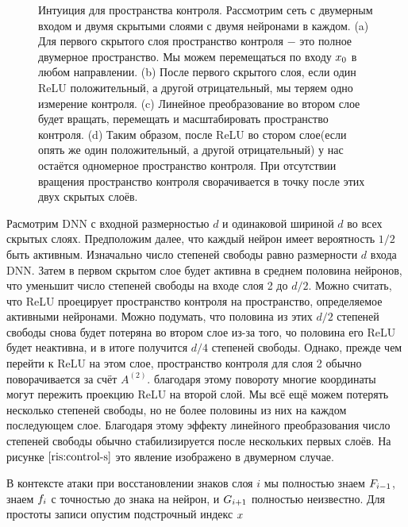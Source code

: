 \begin{figure}[h]
	\caption{Интуиция для пространства контроля. Рассмотрим сеть с двумерным входом и двумя скрытыми слоями с двумя нейронами в каждом. (a) Для первого скрытого слоя пространство контроля $-$ это полное двумерное пространство. Мы можем перемещаться по входу $\mathnormal{x}_{0}$ в любом направлении. (b) После первого скрытого слоя, если один ReLU положительный, а другой отрицательный, мы теряем одно измерение контроля. (c) Линейное преобразование во втором слое будет вращать, перемещать и масштабировать пространство контроля. (d) Таким образом, после ReLU во стором слое(если опять же один положительный, а другой отрицательный) у нас остаётся одномерное пространство контроля. При отсутствии вращения пространство контроля сворачивается в точку после этих двух скрытых слоёв.}
	\label{ris:control-s}
\end{figure}

Расмотрим DNN с входной размерностью $d$ и одинаковой шириной $d$ во всех скрытых слоях. Предположим далее, что каждый нейрон имеет вероятность $1/2$ быть активным. Изначально число степеней свободы равно размерности $d$ входа DNN. Затем в первом скрытом слое будет активна в среднем половина нейронов, что уменьшит число степеней свободы на входе слоя 2 до $d/2$. Можно считать, что ReLU проецирует пространство контроля на пространство, определяемое активными нейронами. Можно подумать, что половина из этих $d/2$ степеней свободы снова будет потеряна во втором слое из-за того, чо половина его ReLU будет неактивна, и в итоге получится $d/4$ степеней свободы. Однако, прежде чем перейти к ReLU на этом слое, пространство контроля для слоя 2 обычно поворачивается за счёт $A^{\left(2\right)}$. благодаря этому повороту многие координаты могут пережить проекцию ReLU на второй слой. Мы всё ещё можем потерять несколько степеней свободы, но не более половины из них на каждом последующем слое. Благодаря этому эффекту линейного преобразования число степеней свободы обычно стабилизируется после нескольких первых слоёв. На рисунке $\ref{ris:control-s}$ это явление изображено в двумерном случае.

В контексте атаки при восстановлении знаков слоя $i$ мы полностью знаем $\mathnormal{F}_{i-1}$, знаем $\mathnormal{f}_{i}$ с точностью до знака на нейрон, и $\mathnormal{G}_{i+1}$ полностью неизвестно. Для простоты записи опустим подстрочный индекс $\mathnormal{x}$

